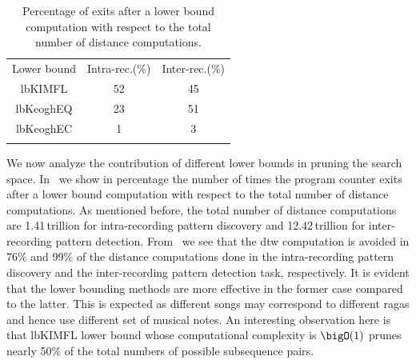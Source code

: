 \begin{table} 
	\begin{centering}
		\begin{tabular}{ c | c c }
			\tabletop
			Lower bound   	& Intra-rec.(\%)		&	Inter-rec.(\%) \\	
			\tablemid
			\acrshort{lbKIMFL}   	& 52	&	45 \\	
			\acrshort{lbKeoghEQ}   	& 23	&	51 \\
			\acrshort{lbKeoghEC}   		& 1	&	3 \\
			\tablebot
		\end{tabular}
		\caption{Percentage of exits after a lower bound computation with respect to the total number of distance computations.}
		\label{tab:computationalStats}	
		\par \end{centering}	
\end{table}

We now analyze the contribution of different lower bounds in pruning the search space. In~ we show in percentage the number of times the program counter exits after a lower bound computation with respect to the total number of distance computations. As mentioned before, the total number of distance computations are 1.41\,trillion for intra-recording pattern discovery and 12.42\,trillion for inter-recording pattern detection. From~ we see that the \gls{dtw} computation is avoided in 76\% and 99\% of the distance computations done in the intra-recording pattern discovery and the inter-recording pattern detection task, respectively. It is evident that the lower bounding methods are more effective in the former case compared to the latter. This is expected as different songs may correspond to different \glspl{raga} and hence use different set of musical notes. An interesting observation here is that \acrshort{lbKIMFL} lower bound whose computational complexity is $\bigO(1)$ prunes nearly 50\% of the total numbers of possible subsequence pairs. 

